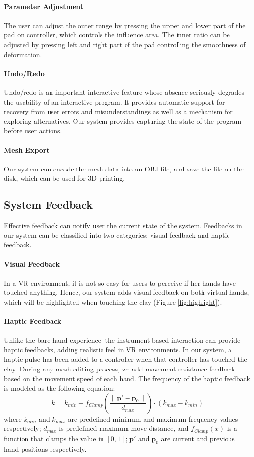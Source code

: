 \documentclass{svjour3}                     %
\begin{document}
\paragraph{Parameter Adjustment}
The user can adjust the outer range by pressing the upper and lower part of the pad on controller, which controls the influence area. The inner ratio can be adjusted by pressing left and right part of the pad controlling the smoothness of deformation.


\paragraph{Undo/Redo}
Undo/redo is an important interactive feature whose absence seriously degrades the usability of an interactive program.\cite{choudhary1995general} It provides automatic support for recovery from user errors and misunderstandings as well as a mechanism for exploring alternatives. Our system provides capturing the state of the program before user actions.

\paragraph{Mesh Export}
Our system can encode the mesh data into an OBJ file, and save the file on the disk, which can be used for 3D printing.

\subsection{System Feedback}
\label{sec:4.4}
Effective feedback can notify user the current state of the system. Feedbacks in our system can be classified into two categories: visual feedback and haptic feedback.
\paragraph{Visual Feedback}
In a VR environment, it is not so easy for users to perceive if her hands have touched anything. Hence, our system adds visual feedback on both virtual hands, which will be highlighted when touching the clay (Figure \ref{fig:highlight}).
\paragraph{Haptic Feedback}
Unlike the bare hand experience, the instrument based interaction can provide haptic feedbacks, adding realistic feel in VR environments. In our system, a haptic pulse has been added to a controller when that controller has touched the clay. During any mesh editing process, we add movement resistance feedback based on the movement speed of each hand. The frequency of the haptic feedback is modeled as the following equation:
\begin{equation}
k = k_{min} + f_{Clamp}(\frac{ \| \mathbf{p'} - \mathbf{p}_{0} \|}{d_{max}}) \cdot (k_{max} - k_{min})
\end{equation}
where $k_{min}$ and $k_{max}$ are predefined minimum and maximum frequency values respectively; $d_{max}$ is predefined maximum move distance, and $f_{Clamp}(x)$ is a function that clamps the value in $[0,1]$; $\mathbf{p'}$ and $\mathbf{p}_{0}$ are current and previous hand positions respectively.
\end{document}
